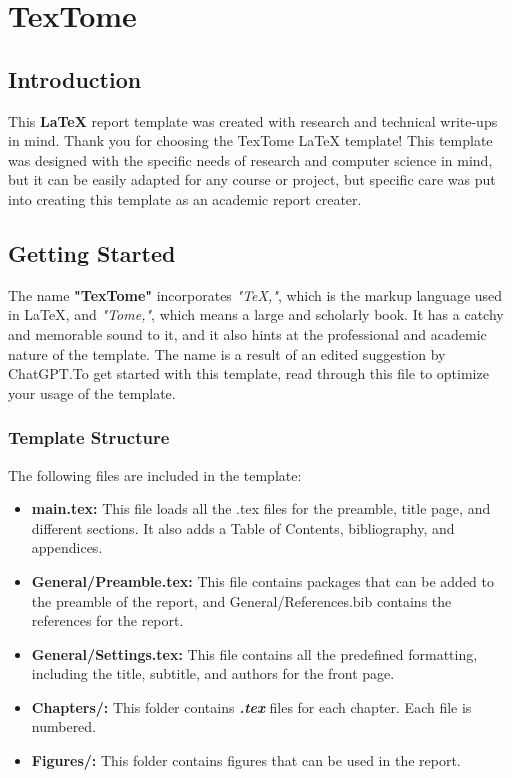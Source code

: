 \section{TexTome} \label{section: introduction}

\vspace{1.5cm}
\subsection{Introduction} 
This \textbf{LaTeX} report template was created with research and technical write-ups in mind. Thank you for choosing the TexTome LaTeX template! This template was designed with the specific needs of research and computer science in mind, but it can be easily adapted for any course or project, but specific care was put into creating this template as an academic report creater. \\
 
\subsection{Getting Started} 
\label{subsec:beg}
The name \textbf{"TexTome"} incorporates \textit{"TeX,"}, which is the markup language used in \LaTeX, and \textit{"Tome,"}, which means a large and scholarly book. It has a catchy and memorable sound to it, and it also hints at the professional and academic nature of the template. The name is a result of an edited suggestion by ChatGPT.To get started with this template, read through this file to optimize your usage of the template. \\

\subsubsection{Template Structure} 
\label{subsec:struct}
The following files are included in the template:

\begin{itemize}
    \item \textbf{main.tex:} This file loads all the .tex files for the preamble, title page, and different sections. It also adds a Table of Contents, bibliography, and appendices.
    \item \textbf{General/Preamble.tex:} This file contains packages that can be added to the preamble of the report, and General/References.bib contains the references for the report.
    \item \textbf{General/Settings.tex:} This file contains all the predefined formatting, including the title, subtitle, and authors for the front page.
    \item \textbf{Chapters/:} This folder contains \textbf{\textit{.tex}} files for each chapter. Each file is numbered.
    \item \textbf{Figures/:} This folder contains figures that can be used in the report. 
\end{itemize} \\


